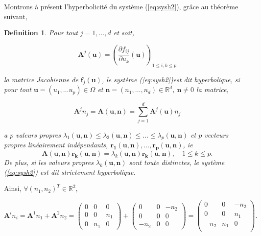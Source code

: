 \documentclass[a4paper,oneside,10pt]{report}
\newtheorem{mydef}{Definition}
\begin{document}
Montrons à présent l'hyperbolicité du système (\ref{eq:sysh2}), grâce au théorème suivant,
\begin{mydef}
\label{th1}
Pour tout $j=1,\dots,d$ et soit,

\begin{equation}
\mathbf{A}^j(\mathbf{u}) = \left( \frac{\partial f_{ij}}{\partial u_k} (\mathbf{u}) \right)_{1\leq i,k\leq p}
\end{equation}

la matrice Jacobienne de $\mathbf{f}_j(\mathbf{u})$, le système (\ref{eq:sysh2})est dit hyperbolique, si pour tout $\mathbf{u}=(u_1,\dots u_p) \in\Omega$ et $\mathbf{n}=(n_1,\dots, n_d) \in \mathbb{R}^d$, $\mathbf{n} \neq 0$ la matrice,

\begin{equation}
\mathbf A^jn_j = \mathbf{A}(\mathbf{u},\mathbf{n}) = \sum\limits_{j=1}^d \mathbf{A}^j(\mathbf{u})n_j 
\end{equation}

a $p$ valeurs propres $\lambda_1(\mathbf{u},\mathbf{n}) \leq \lambda_2(\mathbf{u},\mathbf{n}) \leq \dots \leq  \lambda_p(\mathbf{u},\mathbf{n}) $ et $p$ vecteurs propres linéairement indépendants, $\mathbf{r_1}(\mathbf{u},\mathbf{n}), \dots, \mathbf{r_p}(\mathbf{u},\mathbf{n})$, \textit{ie} 
\begin{equation}
\mathbf{A}(\mathbf{u},\mathbf{n})\mathbf{r_k}(\mathbf{u},\mathbf{n}) = \lambda_k(\mathbf{u},\mathbf{n})\mathbf{r_k}(\mathbf{u},\mathbf{n}), \quad 1\leq k \leq p.
\end{equation}
De plus, si les valeurs propres $\lambda_k(\mathbf{u},\mathbf{n})$ sont toute distinctes, le système (\ref{eq:sysh2}) est dit strictement hyperbolique.
\end{mydef}




Ainsi, $\forall (n_1,n_2 )^T \in \mathbb{R}^2$,

\begin{equation}
\mathbf{A}^i n_i = \mathbf{A}^1 n_1 + \mathbf{A}^2 n_2 =
\begin{pmatrix}
0 & 0 & 0\\
0 & 0 & n_1\\
0 & n_1 & 0
\end{pmatrix}
+
\begin{pmatrix}
0 & 0 & -n_2\\
0 & 0 & 0\\
-n_2 & 0 & 0
\end{pmatrix}
=
\begin{pmatrix}
0 & 0 & -n_2\\
0 & 0 & n_1\\
-n_2 & n_1 & 0\\
\end{pmatrix}.
\end{equation}
\end{document}
